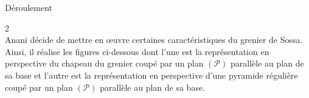  \newpage
  \begin{center}
  	Déroulement
  \end{center}
  \begin{multicols}{2}
  	\\
  	\setcounter{q}{0}
  	\hspace*{0.5cm} Anani décide de mettre en œuvre certaines caractéristiques du 
  	grenier de Sossa. Ainsi, il réalise les figures ci-dessous dont l’une 
  	est la représentation en perspective du chapeau du grenier 
  	coupé par un plan $\mathcal{(P)}$ parallèle au plan de sa base et l’autre est 
  	la représentation en perspective d’une pyramide régulière coupé 
  	par un plan $\mathcal{(P)}$ parallèle au plan de sa base.
  \end{multicols}
  
